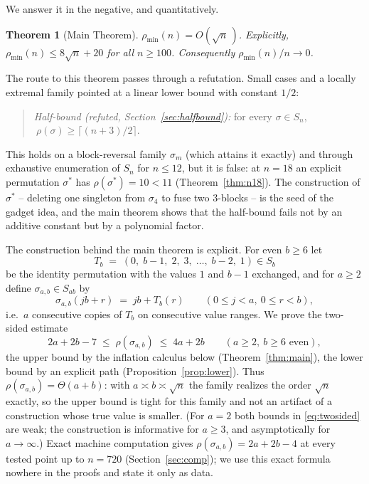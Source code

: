 \documentclass[11pt]{article}
\newtheorem{theorem}{Theorem}[section]
\theoremstyle{definition}
\newcommand{\pmin}{\rho_{\min}}
\begin{document}
We answer it in the negative, and quantitatively.

\begin{theorem}[Main Theorem]\label{thm:main-intro}
$\pmin(n) = O(\sqrt n\,)$. Explicitly, $\pmin(n) \le 8\sqrt n + 20$ for all
$n \ge 100$. Consequently $\pmin(n)/n \to 0$.
\end{theorem}

The route to this theorem passes through a refutation. Small cases and a locally
extremal family pointed at a linear lower bound with constant $1/2$:

\begin{quote}
\emph{Half-bound (refuted, Section~\ref{sec:halfbound}):} for every $\sigma\in S_n$,
$\ \rho(\sigma) \ge \lceil (n+3)/2 \rceil$.
\end{quote}

This holds on a block-reversal family $\sigma_m$ (which attains it exactly) and through
exhaustive enumeration of $S_n$ for $n\le 12$, but it is false: at $n=18$ an explicit
permutation $\sigma^*$ has $\rho(\sigma^*)=10<11$ (Theorem~\ref{thm:n18}). The
construction of $\sigma^*$ -- deleting one singleton from $\sigma_4$ to fuse two
$3$-blocks -- is the seed of the gadget idea, and the main theorem shows that the
half-bound fails not by an additive constant but by a polynomial factor.

The construction behind the main theorem is explicit. For even $b\ge 6$ let
\[
T_b \;=\; (0,\; b{-}1,\; 2,\; 3,\; \dots,\; b{-}2,\; 1) \in S_b
\]
be the identity permutation with the values $1$ and $b-1$ exchanged, and for $a \ge 2$
define $\sigma_{a,b} \in S_{ab}$ by
\[
\sigma_{a,b}(jb + r) \;=\; jb + T_b(r) \qquad (0 \le j < a,\ 0 \le r < b),
\]
i.e.\ $a$ consecutive copies of $T_b$ on consecutive value ranges. We prove the
two-sided estimate
\begin{equation}\label{eq:twosided}
2a + 2b - 7 \;\le\; \rho(\sigma_{a,b}) \;\le\; 4a + 2b
\qquad (a \ge 2,\ b \ge 6 \text{ even}),
\end{equation}
the upper bound by the inflation calculus below
(Theorem~\ref{thm:main}), the lower bound by an
explicit path (Proposition~\ref{prop:lower}). Thus $\rho(\sigma_{a,b}) = \Theta(a+b)$:
with $a \asymp b \asymp \sqrt n$ the family realizes the order $\sqrt n$ exactly, so
the upper bound is tight for this family and not an artifact of a construction whose
true value is smaller. (For $a = 2$ both bounds in \eqref{eq:twosided} are weak; the
construction is informative for $a \ge 3$, and asymptotically for $a \to \infty$.)
Exact machine computation gives $\rho(\sigma_{a,b}) = 2a + 2b - 4$ at every tested
point up to $n = 720$ (Section~\ref{sec:comp}); we use this exact formula nowhere in
the proofs and state it only as data.
\end{document}
